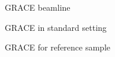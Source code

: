 \documentclass{beamer}
\begin{document}
\begin{frame}{\centering GRACE beamline}
  \vspace{0.025cm}
\end{frame}


\begin{frame}{\centering GRACE in standard setting}
  \vspace{0.025cm}
\end{frame}



\begin{frame}{\centering GRACE for reference sample}
\end{frame}
\end{document}
